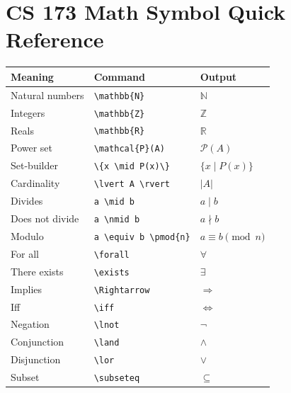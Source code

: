 \documentclass[11pt]{article}
\begin{document}
\section{CS 173 Math Symbol Quick Reference}

\begin{center}
\begin{tabular}{l l l}
  \textbf{Meaning} & \textbf{Command} & \textbf{Output} \\
  \hline
  Natural numbers     & \texttt{\textbackslash{}mathbb\{N\}} & $\mathbb{N}$ \\
  Integers            & \texttt{\textbackslash{}mathbb\{Z\}} & $\mathbb{Z}$ \\
  Reals               & \texttt{\textbackslash{}mathbb\{R\}} & $\mathbb{R}$ \\
  Power set           & \texttt{\textbackslash{}mathcal\{P\}(A)} & $\mathcal{P}(A)$ \\
  Set-builder         & \texttt{\textbackslash\{x \textbackslash{}mid P(x)\textbackslash\}} & $\{x \mid P(x)\}$ \\
  Cardinality         & \texttt{\textbackslash{}lvert A \textbackslash{}rvert} & $\lvert A \rvert$ \\
  Divides             & \texttt{a \textbackslash{}mid b} & $a \mid b$ \\
  Does not divide     & \texttt{a \textbackslash{}nmid b} & $a \nmid b$ \\
  Modulo              & \texttt{a \textbackslash{}equiv b \textbackslash{}pmod\{n\}} & $a \equiv b \pmod{n}$ \\
  For all             & \texttt{\textbackslash{}forall} & $\forall$ \\
  There exists        & \texttt{\textbackslash{}exists} & $\exists$ \\
  Implies             & \texttt{\textbackslash{}Rightarrow} & $\Rightarrow$ \\
  Iff                 & \texttt{\textbackslash{}iff} & $\iff$ \\
  Negation            & \texttt{\textbackslash{}lnot} & $\lnot$ \\
  Conjunction         & \texttt{\textbackslash{}land} & $\land$ \\
  Disjunction         & \texttt{\textbackslash{}lor} & $\lor$ \\
  Subset              & \texttt{\textbackslash{}subseteq} & $\subseteq$ \\

\end{tabular}
\end{center}
\end{document}
